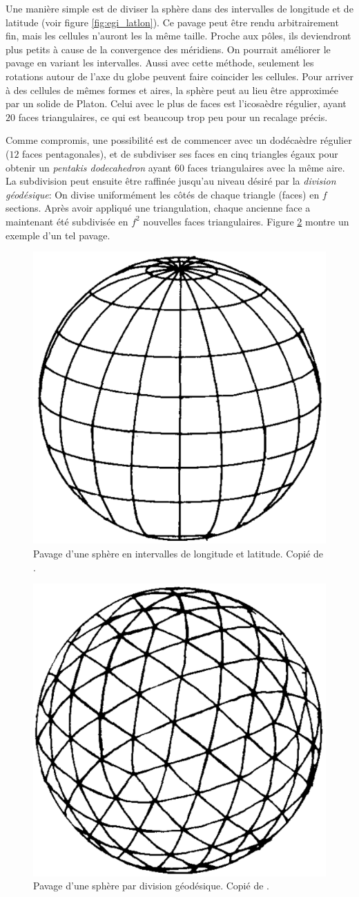 \documentclass[a4paper,10pt]{scrreprt}
\begin{document}
Une manière simple est de diviser la sphère dans des intervalles de longitude et de latitude (voir figure \ref{fig:egi_latlon}). Ce pavage peut être rendu arbitrairement fin, mais les cellules n'auront les la même taille. Proche aux pôles, ils deviendront plus petits à cause de la convergence des méridiens. On pourrait améliorer le pavage en variant les intervalles. Aussi avec cette méthode, seulement les rotations autour de l'axe du globe peuvent faire coincider les cellules. Pour arriver à des cellules de mêmes formes et aires, la sphère peut au lieu être approximée par un solide de Platon. Celui avec le plus de faces est l'icosaèdre régulier, ayant $20$ faces triangulaires, ce qui est beaucoup trop peu pour un recalage précis.

Comme compromis, une possibilité est de commencer avec un dodécaèdre régulier ($12$ faces pentagonales), et de subdiviser ses faces en cinq triangles égaux pour obtenir un \emph{pentakis dodecahedron} ayant $60$ faces triangulaires avec la même aire. La subdivision peut ensuite être raffinée jusqu'au niveau désiré par la \emph{division géodésique}: On divise uniformément les côtés de chaque triangle (faces) en $f$ sections. Après avoir appliqué une triangulation, chaque ancienne face a maintenant été subdivisée en $f^2$ nouvelles faces triangulaires. Figure \ref{fig:egi_geo} montre un exemple d'un tel pavage.

\begin{figure}[p]
\center
\includegraphics[width=.3\textwidth]{egi_lonlat.png}
\caption[Pavage d'une sphère en intervalles de longitude et latitude]{Pavage d'une sphère en intervalles de longitude et latitude. Copié de \cite{Horn1984}.}
\label{fig:egi_lonlat}
\end{figure}

\begin{figure}[p]
\center
\includegraphics[width=.3\textwidth]{egi_geo.png}
\caption[Pavage d'une sphère par division géodésique]{Pavage d'une sphère par division géodésique. Copié de \cite{Horn1984}.}
\label{fig:egi_geo}
\end{figure}
\end{document}
